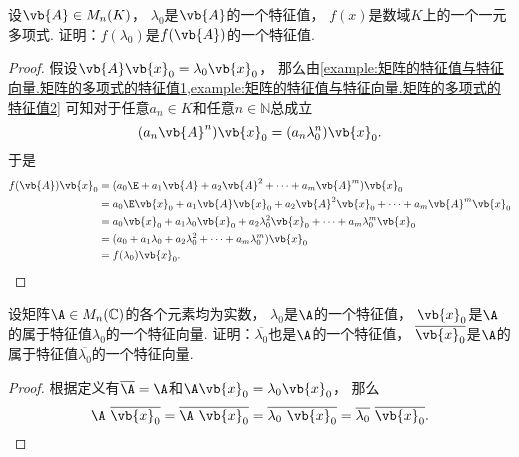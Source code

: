 \begin{example}\label{example:矩阵的特征值与特征向量.矩阵的多项式的特征值4}
设\(\vb{A} \in M_n(K)\)，
\(\lambda_0\)是\(\vb{A}\)的一个特征值，
\(f(x)\)是数域\(K\)上的一个一元多项式.
证明：\(f(\lambda_0)\)是\(f(\vb{A})\)的一个特征值.
\begin{proof}
假设\(\vb{A} \vb{x}_0 = \lambda_0 \vb{x}_0\)，
那么由\cref{example:矩阵的特征值与特征向量.矩阵的多项式的特征值1,example:矩阵的特征值与特征向量.矩阵的多项式的特征值2}
可知对于任意\(a_n \in K\)和任意\(n\in\mathbb{N}\)总成立\begin{equation*}
	(a_n \vb{A}^n) \vb{x}_0
	= (a_n \lambda_0^n) \vb{x}_0.
\end{equation*}
于是\begin{align*}
	f(\vb{A}) \vb{x}_0
	&= (a_0 \E + a_1 \vb{A} + a_2 \vb{A}^2 + \dotsb + a_m \vb{A}^m) \vb{x}_0 \\
	&= a_0 \E \vb{x}_0 + a_1 \vb{A} \vb{x}_0 + a_2 \vb{A}^2 \vb{x}_0 + \dotsb + a_m \vb{A}^m \vb{x}_0 \\
	&= a_0 \vb{x}_0 + a_1 \lambda_0 \vb{x}_0 + a_2 \lambda_0^2 \vb{x}_0 + \dotsb + a_m \lambda_0^m \vb{x}_0 \\
	&= (a_0 + a_1 \lambda_0 + a_2 \lambda_0^2 + \dotsb + a_m \lambda_0^m) \vb{x}_0 \\
	&= f(\lambda_0) \vb{x}_0.
	\qedhere
\end{align*}
\end{proof}
\end{example}
\begin{example}
设矩阵\(\A \in M_n(\mathbb{C})\)的各个元素均为实数，
\(\lambda_0\)是\(\A\)的一个特征值，
\(\vb{x}_0\)是\(\A\)的属于特征值\(\lambda_0\)的一个特征向量.
证明：\(\overline{\lambda_0}\)也是\(\A\)的一个特征值，
\(\overline{\vb{x}_0}\)是\(\A\)的属于特征值\(\overline{\lambda_0}\)的一个特征向量.
\begin{proof}
根据定义有\(\overline{\A} = \A\)和\(\A \vb{x}_0 = \lambda_0 \vb{x}_0\)，
那么\[
	\A~\overline{\vb{x}_0}
	= \overline{\A~\vb{x}_0}
	= \overline{\lambda_0~\vb{x}_0}
	= \overline{\lambda_0}~\overline{\vb{x}_0}.
	\qedhere
\]
\end{proof}
\end{example}

